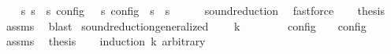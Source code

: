 \begin{isabellebody}
\ \ \isamarkupfalse%
\ {\isacartoucheopen}{\isasymforall}s\ s\ {\isacharparenleft}{\isasymlbrakk}\ s\ {\isasymrbrakk}\isactrlsub c\isactrlsub o\isactrlsub n\isactrlsub f\isactrlsub i\isactrlsub g\ {\isasymsubseteq}\ {\isasymlbrakk}\ s\ {\isasymrbrakk}\isactrlsub c\isactrlsub o\isactrlsub n\isactrlsub f\isactrlsub i\isactrlsub g{\isacharparenright}\ {\isasymor}\ {\isasymnot}{\isacharparenleft}s\ {\isasymhookrightarrow}\ s\isanewline
\ \ \ \ \isamarkupfalse%
\ sound{\isacharunderscore}reduction\ \isamarkupfalse%
\ fastforce\isanewline
\ \ \isamarkupfalse%
\ {\isacharquery}thesis\ \isamarkupfalse%
\ assms\ \isamarkupfalse%
\ blast\isanewline
{}\isamarkupfalse%
%
\endisatagproof
{\isafoldproof}%
%
\isadelimproof
\isanewline
%
\endisadelimproof
\isanewline
{}\isamarkupfalse%
\ sound{\isacharunderscore}reduction{\isacharunderscore}generalized{\isacharcolon}\isanewline
\ \ \ {\isacartoucheopen}{\isasymS}\ {\isasymhookrightarrow}\isactrlbsup k\isactrlesup \ {\isasymS}\isanewline
\ \ \ \ \ {\isacartoucheopen}{\isasymlbrakk}\ {\isasymS}\ {\isasymrbrakk}\isactrlsub c\isactrlsub o\isactrlsub n\isactrlsub f\isactrlsub i\isactrlsub g\ {\isasymsupseteq}\ {\isasymlbrakk}\ {\isasymS}\ {\isasymrbrakk}\isactrlsub c\isactrlsub o\isactrlsub n\isactrlsub f\isactrlsub i\isactrlsub g{\isacartoucheclose}\isanewline
%
\isadelimproof
%
\endisadelimproof
%
\isatagproof
{}\isamarkupfalse%
\ {\isacharminus}\isanewline
\ \ \isamarkupfalse%
\ assms\ \isamarkupfalse%
\ {\isacharquery}thesis\isanewline
\ \ \isamarkupfalse%
\ {\isacharparenleft}induction\ k\ arbitrary{\isacharcolon}\ {\isasymS}\isanewline
\ \ \ \ \isamarkupfalse%
\ {}\isanewline
\ \ \ \ \ \ \isamarkupfalse%
\ {\isacharasterisk}{\isacharcolon}\ {\isacartoucheopen}{\isasymS}\ {\isasymhookrightarrow}\isactrlesup \ {\isasymS}\ {\isasymLongrightarrow}\ {\isasymS}\ {\isacharequal}\ {\isasymS}\ \isamarkupfalse%

\end{isabellebody}
